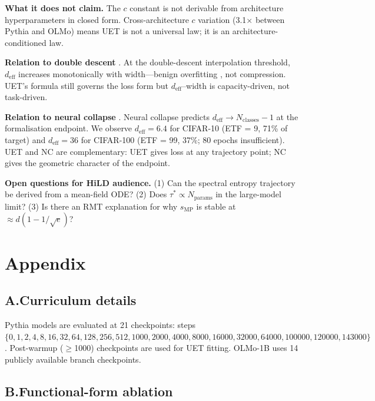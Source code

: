 \documentclass[10pt]{article}
\newcommand{\deff}{d_{\mathrm{eff}}}
\newcommand{\cC}{c}
\theoremstyle{plain}
\theoremstyle{definition}
\theoremstyle{remark}
\begin{document}
\textbf{What it does not claim.}
The $\cC$ constant is not derivable from architecture hyperparameters in closed
form.
Cross-architecture $\cC$ variation (3.1$\times$ between Pythia and OLMo) means
UET is not a universal law; it is an architecture-conditioned law.

\textbf{Relation to double descent} \citep{nakkiran2020dd}.
At the double-descent interpolation threshold, $\deff$ increases monotonically
with width---benign overfitting \citep{bartlett2020benign}, not compression.
UET's formula still governs the loss form but $\deff$--width is
capacity-driven, not task-driven.

\textbf{Relation to neural collapse} \citep{papyan2020nc}.
Neural collapse predicts $\deff \to N_\text{classes} - 1$ at the formalisation
endpoint.
We observe $\deff = 6.4$ for CIFAR-10 (ETF = 9, 71\% of target) and
$\deff = 36$ for CIFAR-100 (ETF = 99, 37\%; 80 epochs insufficient).
UET and NC are complementary: UET gives loss at any trajectory point;
NC gives the geometric character of the endpoint.

\textbf{Open questions for HiLD audience.}
(1) Can the spectral entropy trajectory be derived from a mean-field ODE?
(2) Does $\tau^* \propto N_{\text{params}}$ in the large-model limit?
(3) Is there an RMT explanation for why $s_{\mathrm{MP}}$ is stable at
$\approx d(1 - 1/\sqrt{e})$?




\newpage
\appendix
\section*{Appendix}

\subsection*{A.\enspace Curriculum details}
Pythia models are evaluated at 21 checkpoints: steps
$\{0,1,2,4,8,16,32,64,128,256,512,\allowbreak
  1000,2000,4000,8000,16000,32000,64000,100000,120000,143000\}$.
Post-warmup ($\geq$1000) checkpoints are used for UET fitting.
OLMo-1B uses 14 publicly available branch checkpoints.

\subsection*{B.\enspace Functional-form ablation}
\end{document}
